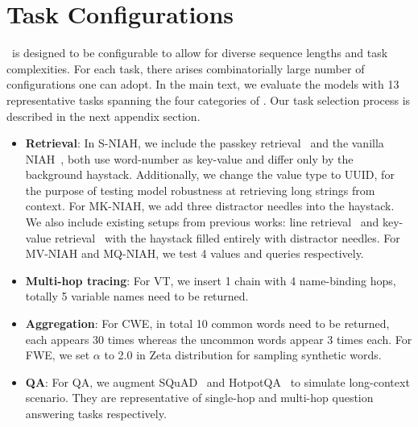 \section{Task Configurations}
\label{task_configurations}
~is designed to be configurable to allow for diverse sequence lengths and task complexities. For each task, there arises combinatorially large number of configurations one can adopt. In the main text, we evaluate the models with 13 representative tasks spanning the four categories of . Our task selection process is described in the next appendix section.
\begin{itemize}[leftmargin=*]
    \item \textbf{Retrieval}: In S-NIAH, we include the passkey retrieval~\citep{landmark} and the vanilla NIAH~\citep{needle}, both use word-number as key-value and differ only by the background haystack. Additionally, we change the value type to UUID, for the purpose of testing model robustness at retrieving long strings from context. For MK-NIAH, we add three distractor needles into the haystack. We also include existing setups from previous works: line retrieval~\citep{longchat} and key-value retrieval~\citep{lostmiddle} with the haystack filled entirely with distractor needles. 
For MV-NIAH and MQ-NIAH, we test 4 values and queries respectively. 
    \item \textbf{Multi-hop tracing}: For VT, we insert 1 chain with 4 name-binding hops, totally 5 variable names need to be returned. 
    \item \textbf{Aggregation}: For CWE, in total 10 common words need to be returned, each appears 30 times whereas the uncommon words appear 3 times each.
For FWE, we set $\alpha$ to 2.0 in Zeta distribution for sampling synthetic words. 
    \item \textbf{QA}: For QA, we augment SQuAD~\citep{squad} and HotpotQA~\citep{hotpotqa} to simulate long-context scenario. They are representative of single-hop and multi-hop question answering tasks respectively.
\end{itemize}


